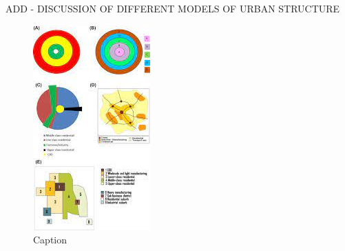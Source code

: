ADD - DISCUSSION OF DIFFERENT MODELS OF URBAN STRUCTURE %


\begin{figure}
    \centering
    \includegraphics{fig/urban-structure.jpeg}
    \caption{Caption}
    \label{fig:my_label}
\end{figure}







